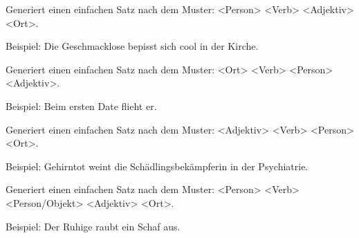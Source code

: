 \documentclass[a4paper,12pt,oneside]{sphinxmanual}
\begin{document}

\begin{fulllineitems}
\label{funktionen:pyzufall.satz_standard_1}
Generiert einen einfachen Satz nach dem Muster: \textless{}Person\textgreater{} \textless{}Verb\textgreater{} \textless{}Adjektiv\textgreater{} \textless{}Ort\textgreater{}.

Beispiel: Die Geschmacklose bepisst sich cool in der Kirche.

\end{fulllineitems}


\begin{fulllineitems}
\label{funktionen:pyzufall.satz_standard_2}
Generiert einen einfachen Satz nach dem Muster: \textless{}Ort\textgreater{} \textless{}Verb\textgreater{} \textless{}Person\textgreater{} \textless{}Adjektiv\textgreater{}.

Beispiel: Beim ersten Date flieht er.

\end{fulllineitems}


\begin{fulllineitems}
\label{funktionen:pyzufall.satz_standard_3}
Generiert einen einfachen Satz nach dem Muster: \textless{}Adjektiv\textgreater{} \textless{}Verb\textgreater{} \textless{}Person\textgreater{} \textless{}Ort\textgreater{}.

Beispiel: Gehirntot weint die Schädlingsbekämpferin in der Psychiatrie.

\end{fulllineitems}


\begin{fulllineitems}
\label{funktionen:pyzufall.satz_standard_4}
Generiert einen einfachen Satz nach dem Muster: \textless{}Person\textgreater{} \textless{}Verb\textgreater{} \textless{}Person/Objekt\textgreater{} \textless{}Adjektiv\textgreater{} \textless{}Ort\textgreater{}.

Beispiel: Der Ruhige raubt ein Schaf aus.

\end{fulllineitems}
\end{document}
